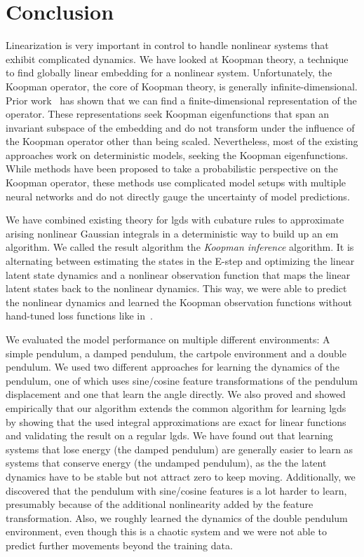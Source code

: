 \chapter{Conclusion}
\label{c:conclusion}



Linearization is very important in control to handle nonlinear systems that exhibit complicated dynamics. We have looked at Koopman theory, a technique to find globally linear embedding for a nonlinear system. Unfortunately, the Koopman operator, the core of Koopman theory, is generally infinite-dimensional. Prior work~\cite{bruntonKoopmanInvariantSubspaces2016,kaiserDatadrivenDiscoveryKoopman2020,luschDeepLearningUniversal2018} has shown that we can find a finite-dimensional representation of the operator. These representations seek Koopman eigenfunctions that span an invariant subspace of the embedding and do not transform under the influence of the Koopman operator other than being scaled. Nevertheless, most of the existing approaches work on deterministic models, seeking the Koopman eigenfunctions. While methods have been proposed to take a probabilistic perspective on the Koopman operator, these methods use complicated model setups with multiple neural networks and do not directly gauge the uncertainty of model predictions.

We have combined existing theory for \acl{lgds} with cubature rules to approximate arising nonlinear Gaussian integrals in a deterministic way to build up an \acl{em} algorithm. We called the result algorithm the \emph{Koopman inference} algorithm. It is alternating between estimating the states in the E-step and optimizing the linear latent state dynamics and a nonlinear observation function that maps the linear latent states back to the nonlinear dynamics. This way, we were able to predict the nonlinear dynamics and learned the Koopman observation functions without hand-tuned loss functions like in~\cite{luschDeepLearningUniversal2018}.

We evaluated the model performance on multiple different environments: A simple pendulum, a damped pendulum, the cartpole environment and a double pendulum. We used two different approaches for learning the dynamics of the pendulum, one of which uses sine/cosine feature transformations of the pendulum displacement and one that learn the angle directly. We also proved and showed empirically that our algorithm extends the common algorithm for learning \ac{lgds} by showing that the used  integral approximations are exact for linear functions and validating the result on a regular \ac{lgds}. We have found out that learning systems that lose energy (\eg the damped pendulum) are generally easier to learn as systems that conserve energy (\eg the undamped pendulum), as the the latent dynamics have to be stable but not attract zero to keep moving. Additionally, we discovered that the pendulum with sine/cosine features is a lot harder to learn, presumably because of the additional nonlinearity added by the feature transformation. Also, we roughly learned the dynamics of the double pendulum environment, even though this is a chaotic system and we were not able to predict further movements beyond the training data.


